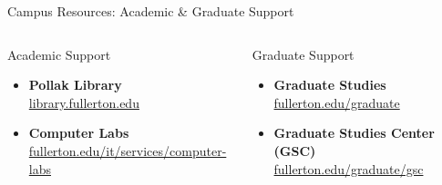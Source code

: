 \documentclass[10pt,aspectratio=169]{beamer}
\begin{document}
\begin{frame}{Campus Resources: Academic \& Graduate Support}
\begin{columns}[T,onlytextwidth]
  \begin{block}{Academic Support}
    \begin{itemize}\setlength{\itemsep}{4pt}
      \item \textbf{Pollak Library}\\[-2pt]
        \footnotesize\href{https://library.fullerton.edu}{library.fullerton.edu}
      \item \textbf{Computer Labs}\\[-2pt]
        \footnotesize\href{https://www.fullerton.edu/it/services/computer-labs/}{fullerton.edu/it/services/computer-labs}
    \end{itemize}
  \end{block}

  \begin{block}{Graduate Support}
    \begin{itemize}\setlength{\itemsep}{4pt}
      \item \textbf{Graduate Studies}\\[-2pt]
        \footnotesize\href{https://www.fullerton.edu/graduate}{fullerton.edu/graduate}
      \item \textbf{Graduate Studies Center (GSC)}\\[-2pt]
        \footnotesize\href{https://www.fullerton.edu/graduate/gsc/index.html}{fullerton.edu/graduate/gsc}
    \end{itemize}
  \end{block}
\end{columns}
\end{frame}
\end{document}

